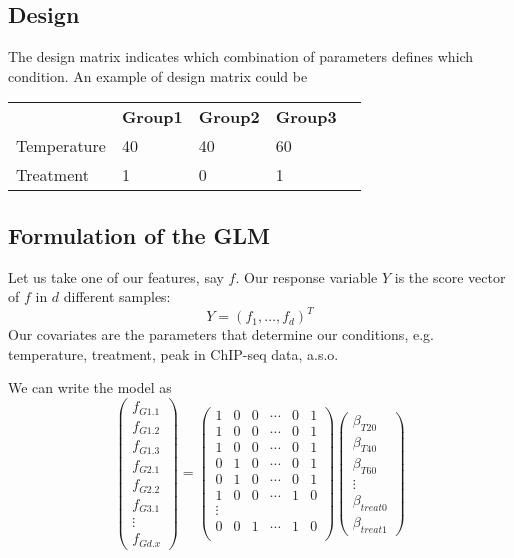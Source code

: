 \documentclass[a4paper,11pt]{article}
\begin{document}
\subsection{Design}
The design matrix indicates which combination of parameters defines which condition. An example of design matrix could be

\vspace{0.5 cm}
\begin{tabular}{lllll}
             & \textbf{Group1} & \textbf{Group2} & \textbf{Group3}\\
Temperature  & 40       & 40       & 60 \\
Treatment    & 1        & 0        & 1  
\end{tabular}
\vspace{0.5 cm}

\subsection{Formulation of the GLM}

Let us take one of our features, say $f$. Our response variable $Y$ is the score vector of $f$ in $d$ different samples:
$$ Y = (f_1,\ldots,f_d)^T $$
Our covariates are the parameters that determine our conditions, e.g. temperature, treatment, peak in ChIP-seq data, a.s.o.

We can write the model as 
$$ 
\begin{pmatrix} 
f_{G1.1} \\ f_{G1.2} \\ f_{G1.3} \\ f_{G2.1} \\ f_{G2.2} \\ f_{G3.1} \\ \vdots \\ f_{Gd.x}
\end{pmatrix}
=
\begin{pmatrix}
1 & 0 & 0 & \cdots & 0 & 1 \\
1 & 0 & 0 & \cdots & 0 & 1 \\
1 & 0 & 0 & \cdots & 0 & 1 \\
0 & 1 & 0 & \cdots & 0 & 1 \\
0 & 1 & 0 & \cdots & 0 & 1 \\
1 & 0 & 0 & \cdots & 1 & 0 \\
\vdots \\
0 & 0 & 1 & \cdots & 1 & 0 \\
\end{pmatrix}
\begin{pmatrix}
\beta_{T20} \\ \beta_{T40} \\ \beta_{T60} \\ \vdots \\ \beta_{treat0} \\ \beta_{treat1}
\end{pmatrix}	
$$
\end{document}
